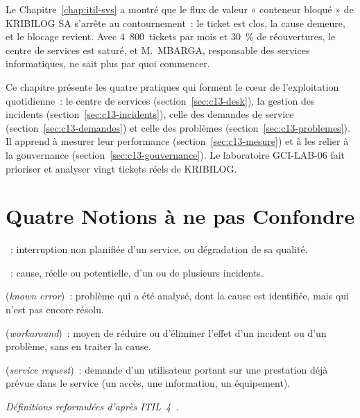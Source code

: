 Le Chapitre~\ref{chap:itil-svs} a montré que le flux de valeur
« conteneur bloqué » de KRIBILOG SA s'arrête au contournement~: le
ticket est clos, la cause demeure, et le blocage revient. Avec
4~800~tickets par mois et 30~\% de réouvertures, le centre de services
est saturé, et M.~MBARGA, responsable des services informatiques, ne sait
plus par quoi commencer.

Ce chapitre présente les quatre pratiques qui forment le cœur de
l'exploitation quotidienne~: le centre de services
(section~\ref{sec:c13-desk}), la gestion des incidents
(section~\ref{sec:c13-incidents}), celle des demandes de service
(section~\ref{sec:c13-demandes}) et celle des problèmes
(section~\ref{sec:c13-problemes}). Il apprend à mesurer leur performance
(section~\ref{sec:c13-mesure}) et à les relier à la gouvernance
(section~\ref{sec:c13-gouvernance}). Le laboratoire GCI-LAB-06 fait
prioriser et analyser vingt tickets réels de KRIBILOG.

\separateur

\section{Quatre Notions à ne pas Confondre}
\label{sec:c13-notions}

\begin{boxdef}
~: interruption non planifiée d'un
service, ou dégradation de sa qualité.

\medskip
{}~: cause, réelle ou potentielle, d'un ou
de plusieurs incidents.

\medskip
{} (\textit{known error})~:
problème qui a été analysé, dont la cause est identifiée, mais qui n'est
pas encore résolu.

\medskip
{}
(\textit{workaround})~: moyen de réduire ou d'éliminer l'effet d'un
incident ou d'un problème, sans en traiter la cause.

\medskip
{} (\textit{service
request})~: demande d'un utilisateur portant sur une prestation déjà
prévue dans le service (un accès, une information, un équipement).
\end{boxdef}
{\small\itshape Définitions reformulées d'après ITIL~4~\cite{axelos2019itil4}.}

